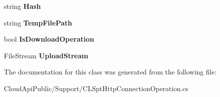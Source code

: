 \begin{DoxyCompactItemize}
\item 
\hypertarget{class_cloud_api_public_1_1_support_1_1_c_l_h_t_t_p_connection_operation_aa41eb2c49f039126c276c4e3337435b2}{string {\bfseries Hash}}\label{class_cloud_api_public_1_1_support_1_1_c_l_h_t_t_p_connection_operation_aa41eb2c49f039126c276c4e3337435b2}

\item 
\hypertarget{class_cloud_api_public_1_1_support_1_1_c_l_h_t_t_p_connection_operation_a112ca9a46b0ca467aabb2c86f39f6c0a}{string {\bfseries Temp\-File\-Path}}\label{class_cloud_api_public_1_1_support_1_1_c_l_h_t_t_p_connection_operation_a112ca9a46b0ca467aabb2c86f39f6c0a}

\item 
\hypertarget{class_cloud_api_public_1_1_support_1_1_c_l_h_t_t_p_connection_operation_a819481aad3e848a5c74d08d2b7257826}{bool {\bfseries Is\-Download\-Operation}}\label{class_cloud_api_public_1_1_support_1_1_c_l_h_t_t_p_connection_operation_a819481aad3e848a5c74d08d2b7257826}

\item 
\hypertarget{class_cloud_api_public_1_1_support_1_1_c_l_h_t_t_p_connection_operation_a7c3621f3bdfb55dcf0189294876ab4d0}{File\-Stream {\bfseries Upload\-Stream}}\label{class_cloud_api_public_1_1_support_1_1_c_l_h_t_t_p_connection_operation_a7c3621f3bdfb55dcf0189294876ab4d0}

\end{DoxyCompactItemize}


The documentation for this class was generated from the following file\-:\begin{DoxyCompactItemize}
\item 
Cloud\-Api\-Public/\-Support/C\-L\-Spt\-Http\-Connection\-Operation.\-cs\end{DoxyCompactItemize}
